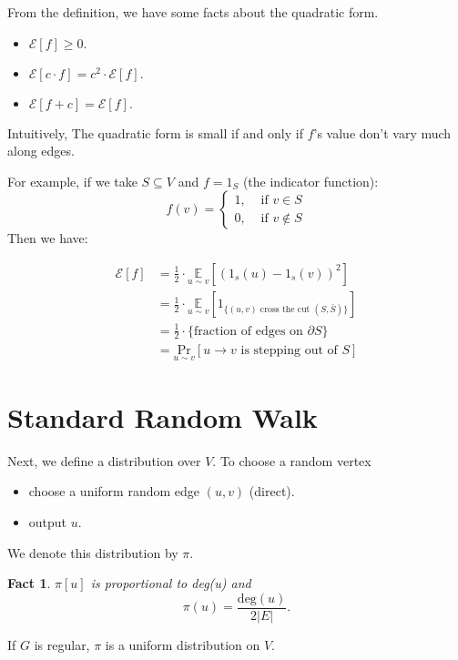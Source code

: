 \documentclass{article}
\newtheorem{fact}[theorem]{Fact}
\begin{document}
From the definition, we have some facts about the quadratic form.
\begin{itemize}
  \item $\mathcal{E}[f] \geq 0.$
  \item $\mathcal{E}[c \cdot f] = c^2 \cdot \mathcal{E}[f].$
  \item $\mathcal{E}[f + c] = \mathcal{E}[f].$
\end{itemize}
Intuitively, The quadratic form is small if and only if $f$'s value don't vary much along edges.
\par For example, if we take $S \subseteq V$ and $f = 1_{S}$ (the indicator function):
$$
f(v)=\left\{
  \begin{array}{ll}
  1, & \text { if } v \in S \\
  0, & \text { if } v \notin S
  \end{array}
  \right.
$$
Then we have:

\begin{align*}
  \mathcal{E}[f] &= \frac{1}{2} \cdot \underset{u \sim v}{\mathbb{E}}[(1_{s}(u) - 1_{s}(v))^2] \\
  &= \frac{1}{2} \cdot \underset{u \sim v}{\mathbb{E}}[1_{\{(u,v) \text{ cross the cut } (S, \bar{S})\}}] \\
  &= \frac{1}{2} \cdot \{\text{fraction of edges on } \partial S\} \\
  &= \underset{u \sim v}{\text{Pr}} [ u \rightarrow v \text{ is stepping out of } S]
\end{align*}

\section{Standard Random Walk}
Next, we define a distribution over $V$. To choose a random vertex
\begin{itemize}
  \item choose a uniform random edge $(u, v)$ (direct).
  \item output $u$.
\end{itemize}
We denote this distribution by $\pi$.
\begin{fact}
  $\pi[u]$ is proportional to deg(u) and 
  $$\pi(u) = \frac{\text{deg}(u)}{2|E|}.$$
\end{fact}
If $G$ is regular, $\pi$ is a uniform distribution on $V$.


\end{document}
